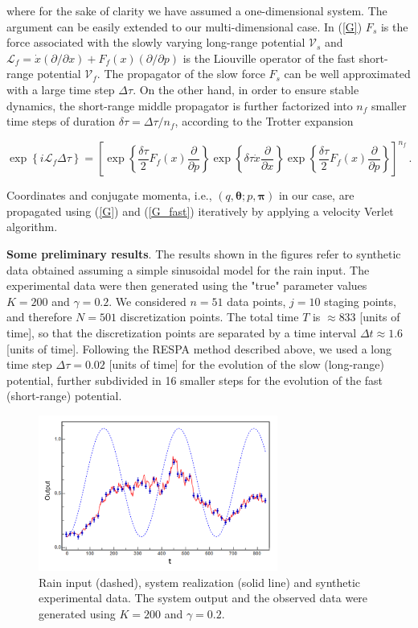 \documentclass[11pt, a4paper]{article}
\newcommand{\bt}{\pmb\theta}
\begin{document}
where for the sake of clarity we have assumed a one-dimensional system. The argument can be easily extended to our multi-dimensional case. In (\ref{G}) $F_s$ is the force associated with the slowly varying long-range potential ${\mathcal V}_s$ and $\mathcal{L}_f = \dot{x}(\partial/\partial x) + F_f(x)(\partial/\partial p)$ is the Liouville operator of the fast short-range potential ${\mathcal V}_f$. The propagator of the slow force $F_s$ can be well approximated with a large time step $\Delta \tau$. On the other hand, in order to ensure stable dynamics, the short-range middle propagator is further factorized into $n_f$ smaller time steps of duration $\delta \tau = \Delta \tau / n_f$, according to the Trotter expansion

\begin{equation}\label{G_fast}
  \exp\left\{ i \mathcal{L}_f \Delta \tau  \right\}
  =\left[
  \exp\left\{ \frac{\delta \tau}{2} F_f(x) \frac{\partial}{\partial p} \right\}
  \exp\left\{  \delta\tau \dot{x} \frac{\partial}{\partial x}  \right\}
  \exp\left\{  \frac{\delta \tau}{2} F_f(x) \frac{\partial}{\partial p} \right\}
  \right]^{n_f} \,.
\end{equation}

Coordinates and conjugate momenta, i.e., $(q,\bt; p,{\pmb\pi})$ in our case, are propagated using (\ref{G}) and (\ref{G_fast}) iteratively by applying a velocity Verlet algorithm.

\textbf{Some preliminary results}. The results shown in the figures refer to synthetic data obtained assuming a simple sinusoidal model for the rain input. The experimental data were then generated using the "true" parameter values $K=200$ and $\gamma = 0.2$. We considered $n=51$ data points, $j=10$ staging points, and therefore $N=501$ discretization points. The total time $T$ is $\approx 833$ [units of time], so that the discretization points are separated by a time interval $\Delta t \approx 1.6 $ [units of time]. Following the RESPA method described above, we used a long time step $\Delta \tau = 0.02$ [units of time] for the evolution of the slow (long-range) potential, further subdivided in 16 smaller steps for the evolution of the fast (short-range) potential.

\begin{figure}
    \centering
    \includegraphics[width=0.7\textwidth]{Figs/FigRainData.png}
    \caption{Rain input (dashed), system realization (solid line) and synthetic experimental data. The system output and the observed data were generated using $K=200$ and $\gamma = 0.2$.}
    \label{fig:rain_data_S}
\end{figure}
\end{document}
